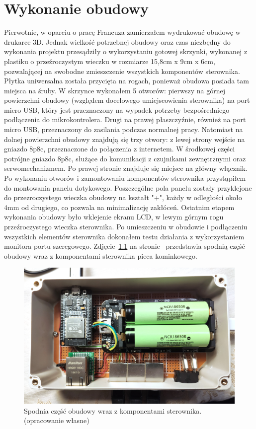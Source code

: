 \documentclass[11pt]{report}
\begin{document}
 \chapter{Wykonanie obudowy}\label{ch:obudowa}
 Pierwotnie, w oparciu o pracę Francuza \cite{Frence2014} zamierzałem wydrukować obudowę w  drukarce 3D. Jednak wielkość potrzebnej obudowy oraz czas niezbędny do wykonania projektu przesądziły o wykorzystaniu gotowej skrzynki, wykonanej z plastiku o przeźroczystym wieczku w rozmiarze 15,8cm x 9cm x 6cm, pozwalającej na swobodne zmieszczenie wszystkich komponentów sterownika. Płytka uniwersalna została przycięta na rogach, ponieważ obudowa posiada tam miejsca na śruby. W skrzynce wykonałem 5 otworów: pierwszy na górnej powierzchni obudowy (względem docelowego umiejscowienia sterownika) na port micro USB, który jest przeznaczony na wypadek potrzeby bezpośredniego podłączenia do mikrokontrolera. Drugi na prawej płaszczyźnie, również na port micro USB, przeznaczony do zasilania podczas normalnej pracy. Natomiast na dolnej powierzchni obudowy znajdują się trzy otwory: z lewej strony wejście na gniazdo 8p8c, przeznaczone do połączenia z internetem. W środkowej części potrójne gniazdo 8p8c, służące do komunikacji z czujnikami zewnętrznymi oraz serwomechanizmem. Po prawej stronie znajduje się miejsce na główny włącznik.
 Po wykonaniu otworów i zamontowaniu komponentów sterownika przystąpiłem do montowania panelu dotykowego. Poszczególne pola panelu zostały przyklejone do przezroczystego wieczka obudowy na kształt "+", każdy w odległości około 4mm od drugiego, co pozwala na minimalizację zakłóceń.
 Ostatnim etapem wykonania obudowy było wklejenie ekranu LCD, w lewym górnym rogu przeźroczystego wieczka sterownika.
 Po umieszczeniu w obudowie i podłączeniu wszystkich elementów sterownika dokonałem testu działania z wykorzystaniem monitora portu szeregowego.
   Zdjęcie~\ref{fig:wnetrze} na stronie~\pageref{fig:wnetrze} przedstawia spodnią część obudowy wraz z komponentami sterownika pieca kominkowego.
\begin{figure}[ht]
\centering
\includegraphics[width=0.8 \textwidth]{fig/wnetrze.jpg}
\caption{Spodnia część obudowy wraz z komponentami sterownika. (opracowanie własne)}
\label{fig:wnetrze}
\end{figure}
 
\end{document}
